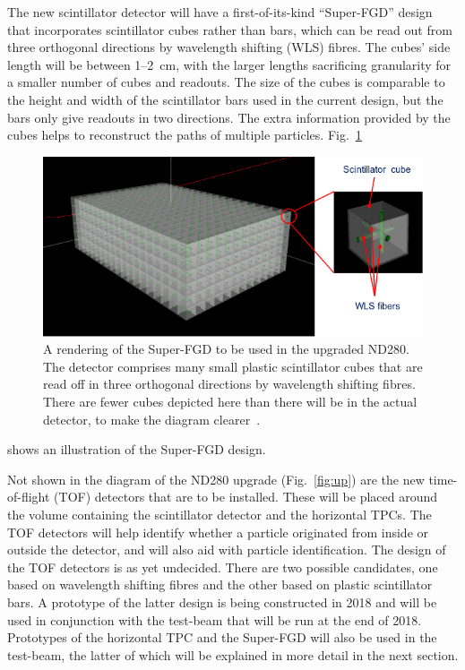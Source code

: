 \documentclass[aps,pra,12pt,notitlepage,tightenlines]{revtex4-1}
\begin{document}
The new scintillator detector will have a first-of-its-kind ``Super-FGD'' design that incorporates scintillator cubes rather than bars, which can be read out from three orthogonal directions by wavelength shifting (WLS) fibres. The cubes' side length will be between 1--2~cm, with the larger lengths sacrificing granularity for a smaller number of cubes and readouts. The size of the cubes is comparable to the height and width of the scintillator bars used in the current design, but the bars only give readouts in two directions. The extra information provided by the cubes helps to reconstruct the paths of multiple particles. Fig.~\ref{fig:sfgd}
 \begin{figure}
  \includegraphics[scale=0.75]{SFGD.png}
  \caption{A rendering of the Super-FGD to be used in the upgraded ND280. The detector comprises many small plastic scintillator cubes that are read off in three orthogonal directions by wavelength shifting fibres. There are fewer cubes depicted here than there will be in the actual detector, to make the diagram clearer~\cite{Blondel:2299599}.}
  \label{fig:sfgd}
 \end{figure}
shows an illustration of the Super-FGD design.

Not shown in the diagram of the ND280 upgrade (Fig.\ \ref{fig:up}) are the new time-of-flight (TOF) detectors that are to be installed. These will be placed around the volume containing the scintillator detector and the horizontal TPCs. The TOF detectors will help identify whether a particle originated from inside or outside the detector, and will also aid with particle identification. The design of the TOF detectors is as yet undecided. There are two possible candidates, one based on wavelength shifting fibres and the other based on plastic scintillator bars. A prototype of the latter design is being constructed in 2018 and will be used in conjunction with the test-beam that will be run at the end of 2018. Prototypes of the horizontal TPC and the Super-FGD will also be used in the test-beam, the latter of which will be explained in more detail in the next section.
\end{document}
